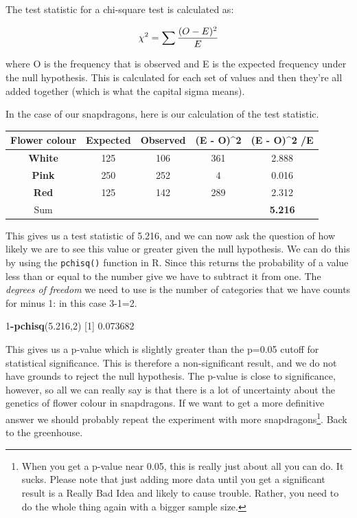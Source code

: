\documentclass[
]{book}
\newenvironment{Shaded}{\begin{snugshade}}{\end{snugshade}}
\newcommand{\DecValTok}[1]{\textcolor[rgb]{0.00,0.00,0.81}{#1}}
\newcommand{\FloatTok}[1]{\textcolor[rgb]{0.00,0.00,0.81}{#1}}
\newcommand{\KeywordTok}[1]{\textcolor[rgb]{0.13,0.29,0.53}{\textbf{#1}}}
\newcommand{\NormalTok}[1]{#1}
\newcommand{\OperatorTok}[1]{\textcolor[rgb]{0.81,0.36,0.00}{\textbf{#1}}}
\begin{document}
The test statistic for a chi-square test is calculated as:

\[\Large \chi^{2} = \sum{ \frac{(O - E)^2}{E}}\]

where O is the frequency that is observed and E is the expected frequency under the null hypothesis. This is calculated for each set of values and then they're all added together (which is what the capital sigma means).

In the case of our snapdragons, here is our calculation of the test statistic.

\begin{longtable}[]{@{}ccccc@{}}
\toprule
Flower colour & Expected & Observed & (E - O)\^{}2 & (E - O)\^{}2 /E\tabularnewline
\midrule
\endhead
\textbf{White} & 125 & 106 & 361 & 2.888\tabularnewline
\textbf{Pink} & 250 & 252 & 4 & 0.016\tabularnewline
\textbf{Red} & 125 & 142 & 289 & 2.312\tabularnewline
Sum & & & & \textbf{5.216}\tabularnewline
\bottomrule
\end{longtable}

This gives us a test statistic of 5.216, and we can now ask the question of how likely we are to see this value or greater given the null hypothesis. We can do this by using the \texttt{pchisq()} function in R. Since this returns the probability of a value less than or equal to the number give we have to subtract it from one. The \emph{degrees of freedom} we need to use is the number of categories that we have counts for minus 1: in this case 3-1=2.

\begin{Shaded}
\begin{Highlighting}[]
\DecValTok{1}\OperatorTok{-}\KeywordTok{pchisq}\NormalTok{(}\FloatTok{5.216}\NormalTok{,}\DecValTok{2}\NormalTok{)}
\NormalTok{[}\DecValTok{1}\NormalTok{] }\FloatTok{0.073682}
\end{Highlighting}
\end{Shaded}

This gives us a p-value which is slightly greater than the p=0.05 cutoff for statistical significance. This is therefore a non-significant result, and we do not have grounds to reject the null hypothesis. The p-value is close to significance, however, so all we can really say is that there is a lot of uncertainty about the genetics of flower colour in snapdragons. If we want to get a more definitive answer we should probably repeat the experiment with more snapdragons\footnote{When you get a p-value near 0.05, this is really just about all you can do. It sucks. Please note that just adding more data until you get a significant result is a Really Bad Idea and likely to cause trouble. Rather, you need to do the whole thing again with a bigger sample size.}. Back to the greenhouse.
\end{document}
